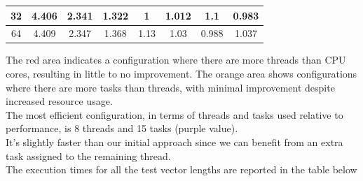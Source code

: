 \documentclass[a4paper, 11pt]{article}
\begin{document}
\begin{table}[H]
{\begin{tabular}{|c|c|c|c|c|c|c|c|}
    \rowcolor[HTML]{FF0000} 
    32        & 4.406                         & 2.341                         & 1.322                         & 1                             & 1.012                         & 1.1                           & 0.983                         \\ \hline
    \rowcolor[HTML]{FF0000} 
    64        & 4.409                         & 2.347                         & 1.368                         & 1.13                          & 1.03                          & 0.988                         & 1.037                         \\ \hline
    \end{tabular}
    }
\end{table}
The red area indicates a configuration where there are more threads than CPU cores, resulting in little to no improvement. The orange area shows configurations where there are more tasks than threads, with minimal improvement despite increased resource usage.\\
The most efficient configuration, in terms of threads and tasks used relative to performance, is 8 threads and 15 tasks (purple value).\\
It's slightly faster than our initial approach since we can benefit from an extra task assigned to the remaining thread.\\
The execution times for all the test vector lengths are reported in the table below
\begin{table}[H]
    \centering
\end{table}
\end{document}
